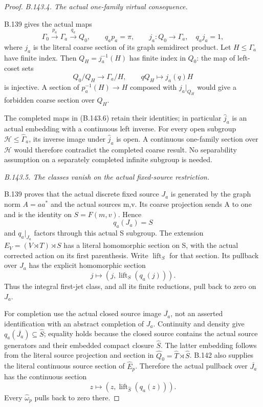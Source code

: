 \begin{proof}
\emph{B.143.4. The actual one-family virtual consequence.}\par
B.139 gives the actual maps
\[
 \Gamma_0\xrightarrow{p_a}\Gamma_a
       \xrightarrow{q_a}Q_0,\qquad q_ap_a=\pi,
 \qquad j_a:Q_0\to\Gamma_a,\quad q_aj_a=1,
 \tag{B.143.6}
\]
where \(j_a\) is the literal coarse section of its graph
semidirect product. Let \(H\leq\Gamma_a\) have finite index.
Then \(Q_H=j_a^{-1}(H)\) has finite index in \(Q_0\):
the map of left-coset sets
\[
        Q_0/Q_H\longrightarrow\Gamma_a/H,\qquad
                 qQ_H\longmapsto j_a(q)H
\]
is injective. A section of \(p_a^{-1}(H)\to H\)
composed with \(j_a|_{Q_H}\) would give a forbidden
coarse section over \(Q_H\).

The completed maps in (B.143.6) retain their identities;
in particular \(\widehat j_a\) is an actual embedding
with a continuous left inverse. For every open subgroup
\(\mathcal H\leq\widehat\Gamma_a\),
its inverse image under \(\widehat j_a\) is open.
A continuous one-family section over \(\mathcal H\)
would therefore contradict the completed coarse result.
No separability assumption on a separately completed
infinite subgroup is needed.

\emph{B.143.5. The classes vanish on the actual fixed-source restriction.}\par
B.139 proves that the actual discrete fixed source \(J_a\)
is generated by the graph norm \(A=aa^*\) and the actual
sources m,v. Its coarse projection sends A to one and
is the identity on \(S=F(m,v)\). Hence
\[
                 q_a(J_a)=S
\]
and \(q_a|_{J_a}\) factors through this actual S subgroup.
The extension \(E_V=(V\rtimes T)\rtimes S\) has a
literal homomorphic section on S, with the actual corrected
action on its first parenthesis. Write \(\operatorname{lift}_S\)
for that section. Its pullback over \(J_a\) has the explicit
homomorphic section
\[
              j\longmapsto
                 (j,\operatorname{lift}_S(q_a(j))).
 \tag{B.143.7}
\]
Thus the integral first-jet class, and all its finite
reductions, pull back to zero on \(J_a\).

For completion use the actual closed source image
\(\overline{J_a}\), not an asserted identification with
an abstract completion of \(J_a\). Continuity and density
give \(q_a(\overline{J_a})\subseteq\widehat S\);
equality holds because the closed source contains the
actual source generators and their embedded compact closure
\(\widehat S\). The latter embedding follows from the
literal source projection and section in
\(\widehat Q_0=\widehat T\rtimes\widehat S\).
B.142 also supplies the literal continuous source section
of \(\widehat E_p\). Therefore the actual pullback over
\(\overline{J_a}\) has the continuous section
\[
              z\longmapsto
                (z,\operatorname{lift}_{\widehat S}(q_a(z))).
 \tag{B.143.8}
\]
Every \(\widehat\omega_p\) pulls back to zero there.


\end{proof}
